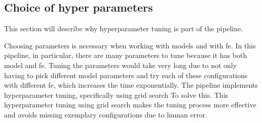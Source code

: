 \subsection{Choice of hyper parameters}
This section will describe why hyperparameter tuning is part of the pipeline. 

Choosing parameters is necessary when working with models and with \gls{fe}. In this pipeline, in particular, there are many parameters to tune because it has both model and \gls{fe}. Tuning the parameters would take very long due to not only having to pick different model parameters and try each of these configurations with different \gls{fe}, which increases the time exponentially. The pipeline implements hyperparameter tuning, specifically using grid search To solve this. This hyperparameter tuning using grid search makes the tuning process more effective and avoids missing exemplary configurations due to human error.